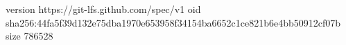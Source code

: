 version https://git-lfs.github.com/spec/v1
oid sha256:44fa5f39d132e75dba1970e653958f34154ba6652c1ce821b6e4bb50912cf07b
size 786528
